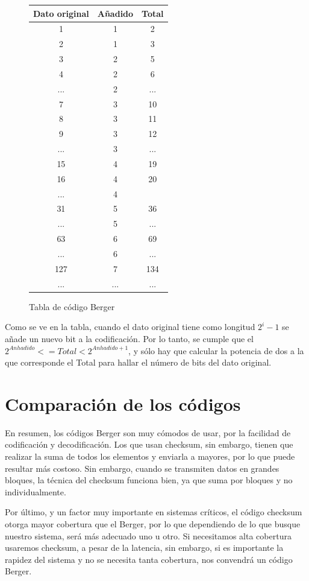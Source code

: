 \documentclass[a4paper]{article}
\begin{document}
	\begin{figure}[h!]
		\centering
		\begin{tabular}{| c | c | c |}
				\hline
				Dato original & Añadido & Total \\ \hline
				\rowcolor{LightCyan}
				1 & 1 & 2 \\ \hline
				2 & 1 & 3 \\ \hline
				\rowcolor{LightCyan}
				3 & 2 & 5 \\ \hline
				4 & 2 & 6 \\ \hline
				... & 2 & ... \\ \hline
				\rowcolor{LightCyan}
				7 & 3 & 10 \\ \hline
				8 & 3 & 11 \\ \hline
				9 & 3 & 12 \\ \hline
				... & 3 & ... \\ \hline
				\rowcolor{LightCyan}
				15 & 4 & 19 \\ \hline
				16 & 4 & 20 \\ \hline
				... & 4 &  \\ \hline
				\rowcolor{LightCyan}
				31 & 5 & 36 \\ \hline
				... & 5 & ... \\ \hline
				\rowcolor{LightCyan}
				63 & 6 & 69 \\ \hline
				... & 6 & ... \\ \hline
				\rowcolor{LightCyan}
				127 & 7 & 134 \\ \hline
				... & ... & ... \\ 
				\hline
		\end{tabular}

		\label{t_berger}
		\caption{Tabla de código Berger}
	\end{figure}
	Como se ve en la tabla, cuando el dato original tiene como longitud $2^i - 1$ se añade un nuevo bit a la codificación. Por lo tanto, se cumple que el $ 2^{Anhadido} <= Total < 2^{Anhadido+1}$, y sólo hay que calcular la potencia de dos a la que corresponde el Total para hallar el número de bits del dato original.

\section{Comparación de los códigos}
	En resumen, los códigos Berger son muy cómodos de usar, por la facilidad de codificación y decodificación. Los que usan checksum, sin embargo, tienen que realizar la suma de todos los elementos y enviarla a mayores, por lo que puede resultar más costoso. Sin embargo, cuando se transmiten datos en grandes bloques, la técnica del checksum funciona bien, ya que suma por bloques y no individualmente.

	Por último, y un factor muy importante en sistemas críticos, el código checksum otorga mayor cobertura que el Berger, por lo que dependiendo de lo que busque nuestro sistema, será más adecuado uno u otro. Si necesitamos alta cobertura usaremos checksum, a pesar de la latencia, sin embargo, si es importante la rapidez del sistema y no se necesita tanta cobertura, nos convendrá un código Berger.
\end{document}
